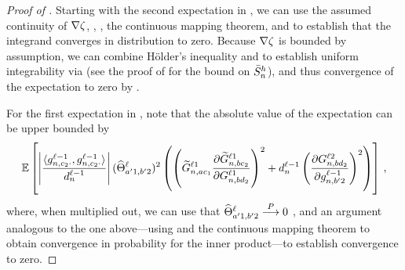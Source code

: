 \begin{proof}[Proof of ]
    Starting with the second expectation in , we can use the assumed continuity of $\nabla \zeta$, , , the continuous mapping theorem, and  to establish that the integrand converges in distribution to zero.
    Because $\nabla \zeta$ is bounded by assumption, we can combine H{\" o}lder's inequality and  to establish uniform integrability via  (see the proof of  for the bound on $\bar{S}_{n}^h$), and thus convergence of the expectation to zero by .
    
    For the first expectation in , note that the absolute value of the expectation can be upper bounded by
    \begin{align*}
        \operatorname*{\mathbb{E}} \left[
            \left|
                \frac{
                    \langle
                        g_{n, c_2 \cdot}^{\ell - 1}
                        ,
                        g_{n, c_2 \cdot}^{\ell - 1}
                    \rangle
                }{
                    d_{n}^{\ell - 1}
                }
            \right|
            (
                \widehat{\Theta}_{
                    a' 1, b' 2
                }^{\ell}
            )^2
            \left(
                \left(
                    \widetilde{G}_{n, a c_1}^{\ell 1}
                    \frac{
                        \partial
                        \widetilde{G}_{n, b c_2}^{\ell 1}
                    }{
                        \partial 
                        G_{n, b d_2}^{\ell 1}
                    }
                \right)^2
                +
                d_{n}^{\ell - 1}
                \left(
                    \frac{
                        \partial 
                        G_{n, b d_2}^{\ell 2}
                    }{
                        \partial g_{n, b' 2}^{\ell - 1}
                    }
                \right)^2
            \right)
        \right]
        \, ,
    \end{align*}
    where, when multiplied out, we can use that $\widehat{\Theta}_{a' 1, b' 2}^{\ell} \overset{P}{\longrightarrow} 0$ \citep{yang2019v2}, and an argument analogous to the one above---using  and the continuous mapping theorem to obtain convergence in probability for the inner product---to establish convergence to zero.

\end{proof}
